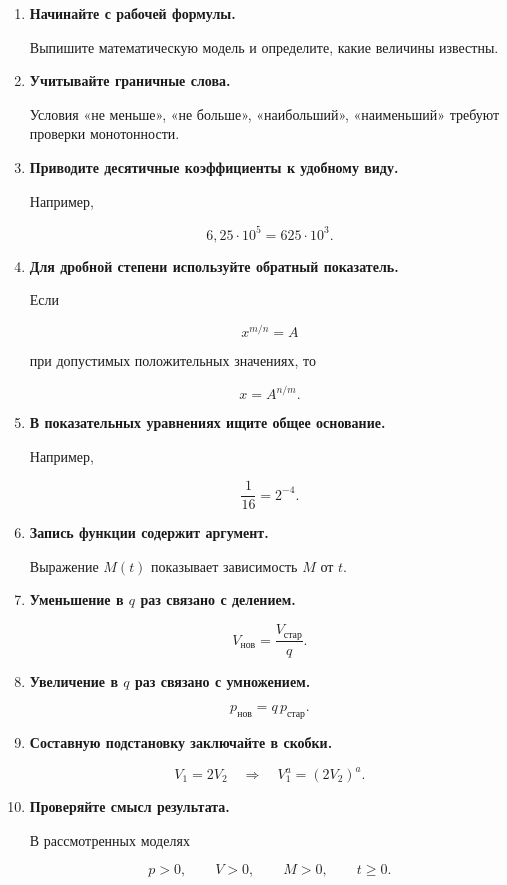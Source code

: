 \documentclass[a4paper,12pt]{article}
\newcommand{\key}[1]{%
  \textbf{\color{darkaccent}#1}%
}
\begin{document}
\begin{enumerate}

  \item
  \key{Начинайте с рабочей формулы.}

  Выпишите математическую модель и определите,
  какие величины известны.

  \item
  \key{Учитывайте граничные слова.}

  Условия
  «не меньше»,
  «не больше»,
  «наибольший»,
  «наименьший»
  требуют проверки монотонности.

  \item
  \key{Приводите десятичные коэффициенты к удобному виду.}

  Например,

  \[
  6{,}25\cdot10^5
  =
  625\cdot10^3.
  \]

  \item
  \key{Для дробной степени используйте обратный показатель.}

  Если

  \[
  x^{m/n}=A
  \]

  при допустимых положительных значениях, то

  \[
  x=A^{n/m}.
  \]

  \item
  \key{В показательных уравнениях ищите общее основание.}

  Например,

  \[
  \frac1{16}=2^{-4}.
  \]

  \item
  \key{Запись функции содержит аргумент.}

  Выражение $M(t)$ показывает зависимость $M$ от $t$.

  \item
  \key{Уменьшение в $q$ раз связано с делением.}

  \[
  V_{\text{нов}}
  =
  \frac{V_{\text{стар}}}{q}.
  \]

  \item
  \key{Увеличение в $q$ раз связано с умножением.}

  \[
  p_{\text{нов}}
  =
  q\,p_{\text{стар}}.
  \]

  \item
  \key{Составную подстановку заключайте в скобки.}

  \[
  V_1=2V_2
  \quad\Longrightarrow\quad
  V_1^a=(2V_2)^a.
  \]

  \item
  \key{Проверяйте смысл результата.}

  В рассмотренных моделях

  \[
  p>0,
  \qquad
  V>0,
  \qquad
  M>0,
  \qquad
  t\ge0.
  \]

\end{enumerate}
\end{document}
